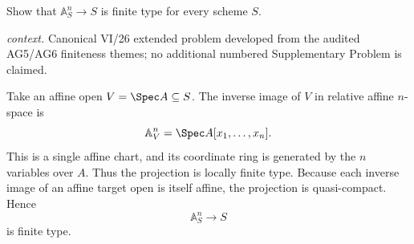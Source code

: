 \begin{problem}\label{prob:vi26-p10}
Show that \(\mathbb A^n_S\to S\) is finite type for every scheme \(S\).
\par\smallskip\noindent\textit{context.} Canonical VI/26 extended problem developed from the audited AG5/AG6 finiteness themes; no additional numbered Supplementary Problem is claimed.
\end{problem}

\ifdefined\FullProblemDossiers
\begin{solution}
Take an affine open \(V=\Spec A\subseteq S\).  The inverse image of \(V\) in relative affine
\(n\)-space is
\[
\mathbb A^n_V=\Spec A[x_1,\ldots,x_n].
\]
This is a single affine chart, and its coordinate ring is generated by the \(n\) variables over
\(A\).  Thus the projection is locally finite type.  Because each inverse image of an affine target
open is itself affine, the projection is quasi-compact.  Hence
\[
\mathbb A^n_S\longrightarrow S
\]
is finite type.
\end{solution}
\fi
